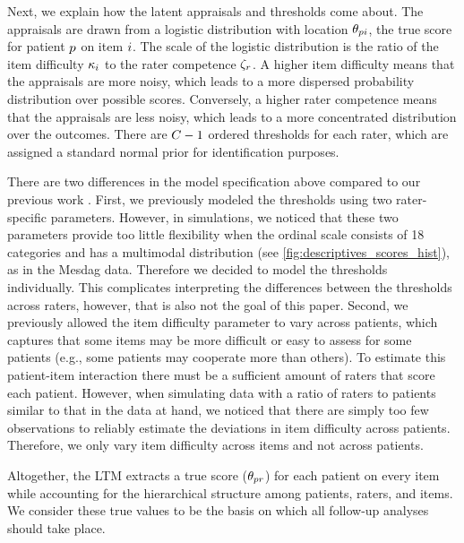 \documentclass[a4paper,11pt]{article}
\begin{document}
Next, we explain how the latent appraisals and thresholds come about.
The appraisals are drawn from a logistic distribution with location $\theta_{pi}$, the true score for patient $p$ on item $i$. The scale of the logistic distribution is the ratio of the item difficulty $\kappa_i$ to the rater competence $\zeta_r$.
A higher item difficulty means that the appraisals are more noisy, which leads to a more dispersed probability distribution over possible scores.
Conversely, a higher rater competence means that the appraisals are less noisy, which leads to a more concentrated distribution over the outcomes.
There are $\Tncat - 1$ ordered thresholds for each rater, which are assigned a standard normal prior for identification purposes.

There are two differences in the model specification above compared to our previous work \parencite{vandenBergh2020cultural}.
First, we previously modeled the thresholds using two rater-specific parameters.
However, in simulations, we noticed that these two parameters provide too little flexibility when the ordinal scale consists of 18 categories and has a multimodal distribution (see \autoref{fig:descriptives_scores_hist}), as in the Mesdag data.
Therefore we decided to model the thresholds individually.
This complicates interpreting the differences between the thresholds across raters, however, that is also not the goal of this paper.
Second, we previously allowed the item difficulty parameter to vary across patients, which captures that some items may be more difficult or easy to assess for some patients (e.g., some patients may cooperate more than others).
To estimate this patient-item interaction there must be a sufficient amount of raters that score each patient.
However, when simulating data with a ratio of raters to patients similar to that in the data at hand, we noticed that there are simply too few observations to reliably estimate the deviations in item difficulty across patients.
Therefore, we only vary item difficulty across items and not across patients.

Altogether, the LTM extracts a true score ($\theta_{pr}$) for each patient on every item while accounting for the hierarchical structure among patients, raters, and items.
We consider these true values to be the basis on which all follow-up analyses should take place.%
\end{document}

